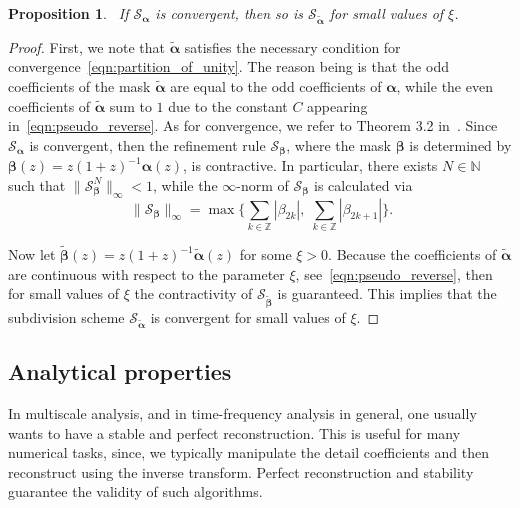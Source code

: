 \documentclass[12pt]{article}
\newtheorem{prop}[theorem]{Proposition}
\begin{document}
\begin{prop}~\label{prop:even_regular_scheme_properties}
    If $\mathcal{S}_{\boldsymbol{\alpha}}$ is convergent, then so is $\mathcal{S}_{\widetilde{\boldsymbol{\alpha}}}$ for small values of $\xi$.
\end{prop}
\begin{proof}
    First, we note that $\widetilde{\boldsymbol{\alpha}}$ satisfies the necessary condition for convergence~\eqref{eqn:partition_of_unity}. The reason being is that the odd coefficients of the mask $\widetilde{\boldsymbol{\alpha}}$ are equal to the odd coefficients of $\boldsymbol{\alpha}$, while the even coefficients of $\widetilde{\boldsymbol{\alpha}}$ sum to $1$ due to the constant $C$ appearing in~\eqref{eqn:pseudo_reverse}. As for convergence, we refer to Theorem 3.2 in~\cite{dyn1992subdivision}. Since $\mathcal{S}_{\boldsymbol{\alpha}}$ is convergent, then the refinement rule $\mathcal{S}_{\boldsymbol{\beta}}$, where the mask $\boldsymbol{\beta}$ is determined by $\boldsymbol{\beta}(z)=z(1+z)^{-1}\boldsymbol{\alpha}(z)$, is contractive. In particular, there exists $N\in\mathbb{N}$ such that $\|\mathcal{S}_{\boldsymbol{\beta}}^N\|_\infty < 1$, while the $\infty$-norm of $\mathcal{S}_{\boldsymbol{\beta}}$ is calculated via
    \begin{equation}~\label{eqn:subdivision_norm}
        \|\mathcal{S}_{\boldsymbol{\beta}}\|_{\infty} = \max\big\{ \sum_{k\in\mathbb{Z}}|\beta_{2k}|, \; \sum_{k\in\mathbb{Z}}|\beta_{2k+1}|\big\}.
    \end{equation}

    Now let $\widetilde{\boldsymbol{\beta}}(z)=z(1+z)^{-1}\widetilde{\boldsymbol{\alpha}}(z)$ for some $\xi>0$. Because the coefficients of $\widetilde{\boldsymbol{\alpha}}$ are continuous with respect to the parameter $\xi$, see~\eqref{eqn:pseudo_reverse}, then for small values of $\xi$ the contractivity of $\mathcal{S}_{\widetilde{\boldsymbol{\beta}}}$ is guaranteed. This implies that the subdivision scheme $\mathcal{S}_{\widetilde{\boldsymbol{\alpha}}}$ is convergent for small values of $\xi$.
\end{proof}

\subsection{Analytical properties}

In multiscale analysis, and in time-frequency analysis in general, one usually wants to have a stable and perfect reconstruction. This is useful for many numerical tasks, since, we typically manipulate the detail coefficients and then reconstruct using the inverse transform. Perfect reconstruction and stability guarantee the validity of such algorithms.
\end{document}

